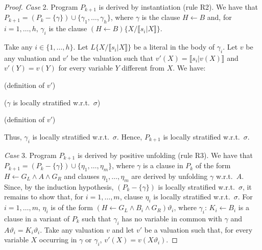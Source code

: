 \documentclass[english]{tlp}
\begin{document}
\begin{proof}
\noindent \emph{Case} 2. Program \( P_{k+1} \) is derived by
instantiation (rule R2). We have that
$P_{k+1}=(P_{k}-\{\gamma\})\cup\{\gamma_{1},\ldots,\gamma_{h}\}$,
where $\gamma$ is the clause $H\leftarrow B$ and, for
$i=1,\ldots,h$, $\gamma_{i}$ is the clause $(H\leftarrow
B)\{X/\llbracket s_i|X\rrbracket \}$. 

\noindent Take any $i\in\{1,\ldots,h\}$. 
Let $L\{X/\llbracket
s_i|X\rrbracket \}$ be a literal in the body of $\gamma_i$. Let $v$
be any valuation and $v'$ be the valuation such that
$v'(X)=\llbracket s_i|v(X)\rrbracket $ and $v'(Y)=v(Y)$ for every
variable $Y$ different from $X$. We have:

\smallskip

 (definition of $v'$)

\hspace*{3.3cm}  ($\gamma$ is
locally stratified w.r.t.~$\sigma$)

\hspace*{3.3cm}  (definition of $v'$)

\smallskip

\noindent Thus, $\gamma_i$ is locally stratified w.r.t.~$\sigma$.
Hence, $P_{k+1}$ is locally stratified w.r.t.~$\sigma$.

\medskip

\noindent \emph{Case} 3. Program \( P_{k+1} \) is derived by
positive unfolding (rule R3). We have that \(
P_{k+1}=(P_{k}-\{\gamma \})\cup \{\eta _{1},\ldots ,\eta _{m}\} \),
where \( \gamma  \) is a clause in \( P_{k} \) of the form \(
H\leftarrow G_{L}\wedge A\wedge G_{R} \) and clauses \( \eta
_{1},\ldots ,\eta _{m} \) are derived by unfolding \( \gamma  \)
w.r.t.~\( A \). Since, by the induction hypothesis, \(
(P_{k}-\{\gamma \}) \) is locally stratified w.r.t.~\( \sigma  \),
it remains to show that, for \( i=1,\ldots ,m \), clause \( \eta
_{i} \) is locally stratified w.r.t.~\( \sigma \). For \( i=1,\ldots
,m \), \( \eta _{i} \) is of the form \( (H\leftarrow G_{L}\wedge
B_{i}\wedge G_{R})\vartheta_i \), where $\gamma_i$: \( K
_{i}\leftarrow B_i \) is a clause in a variant of $P_{k}$  
such that $\gamma_i$ has no variable in common with $\gamma$ and
$A\vartheta_i=K_i\vartheta_i$. Take any valuation \( v \) and let
$v'$ be a valuation such that, for every variable $X$ occurring in
$\gamma$ or $\gamma_i$, $v'(X)=v(X\vartheta_i)$.


\end{proof}
\end{document}
